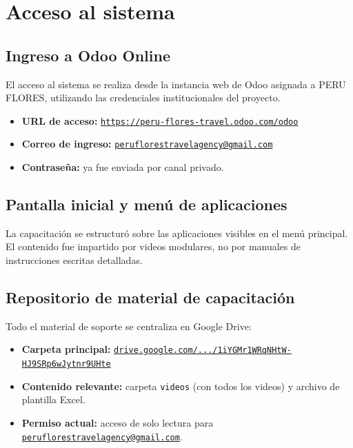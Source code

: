 \section{Acceso al sistema}

\subsection{Ingreso a Odoo Online}

El acceso al sistema se realiza desde la instancia web de Odoo asignada a PERU FLORES, utilizando las credenciales institucionales del proyecto.

\begin{itemize}
    \item \textbf{URL de acceso:} \href{https://peru-flores-travel.odoo.com/odoo}{\texttt{https://peru-flores-travel.odoo.com/odoo}}
    \item \textbf{Correo de ingreso:} \href{mailto:peruflorestravelagency@gmail.com}{\texttt{peruflorestravelagency@gmail.com}}
    \item \textbf{Contraseña:} ya fue enviada por canal privado.
\end{itemize}

\subsection{Pantalla inicial y menú de aplicaciones}

La capacitación se estructuró sobre las aplicaciones visibles en el menú principal. El contenido fue impartido por videos modulares, no por manuales de instrucciones escritas detalladas.

\subsection{Repositorio de material de capacitación}

Todo el material de soporte se centraliza en Google Drive:

\begin{itemize}
    \item \textbf{Carpeta principal:} \href{https://drive.google.com/drive/folders/1iYGMr1WRqNHtW-HJ9SRp6wJytnr9UHte?usp=drive_link}{\texttt{drive.google.com/.../1iYGMr1WRqNHtW-HJ9SRp6wJytnr9UHte}}
    \item \textbf{Contenido relevante:} carpeta \texttt{videos} (con todos los videos) y archivo de plantilla Excel.
    \item \textbf{Permiso actual:} acceso de solo lectura para \href{mailto:peruflorestravelagency@gmail.com}{\texttt{peruflorestravelagency@gmail.com}}.
\end{itemize}

